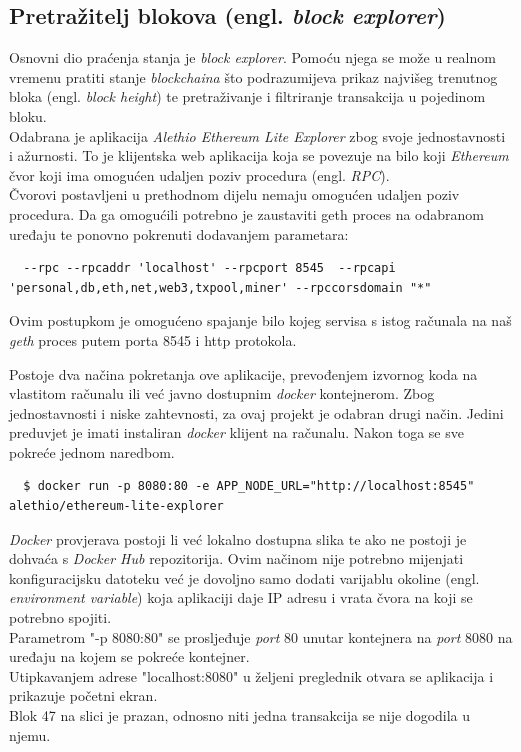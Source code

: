 \documentclass[times, utf8, zavrsni, numeric]{fer}
\begin{document}
\subsection{Pretražitelj blokova (engl. \emph{block explorer})}
Osnovni dio praćenja stanja je \emph{block explorer}. Pomoću njega se može u realnom vremenu pratiti stanje \emph{blockchaina}
što podrazumijeva prikaz najvišeg trenutnog bloka (engl. \emph{block height}) te pretraživanje i filtriranje transakcija u 
pojedinom bloku. \\
Odabrana je aplikacija \emph{Alethio Ethereum Lite Explorer} zbog svoje jednostavnosti i ažurnosti. To je klijentska
web aplikacija koja se povezuje na bilo koji \emph{Ethereum} čvor koji ima omogućen udaljen poziv procedura (engl. \emph{RPC}). \\
Čvorovi postavljeni u prethodnom dijelu nemaju omogućen udaljen poziv procedura. Da ga omogućili potrebno je zaustaviti geth proces
na odabranom uređaju te ponovno pokrenuti dodavanjem parametara:

\begin{lstlisting}
  --rpc --rpcaddr 'localhost' --rpcport 8545  --rpcapi 'personal,db,eth,net,web3,txpool,miner' --rpccorsdomain "*"
\end{lstlisting}

Ovim postupkom je omogućeno spajanje bilo kojeg servisa s istog računala na naš \emph{geth} proces putem porta 8545 i http protokola.

Postoje dva načina pokretanja ove aplikacije, prevođenjem izvornog koda na vlastitom računalu ili već javno dostupnim
\emph{docker} kontejnerom. Zbog jednostavnosti i niske zahtevnosti, za ovaj projekt je odabran drugi način.
Jedini preduvjet je imati instaliran \emph{docker} klijent na računalu. Nakon toga se sve pokreće jednom naredbom.

\begin{lstlisting}
  $ docker run -p 8080:80 -e APP_NODE_URL="http://localhost:8545" alethio/ethereum-lite-explorer
\end{lstlisting}

\emph{Docker} provjerava postoji li već lokalno dostupna slika te ako ne postoji je dohvaća s \emph{Docker Hub} repozitorija.
Ovim načinom nije potrebno mijenjati konfiguracijsku datoteku već je dovoljno samo dodati varijablu okoline (engl. \emph{environment variable})
koja aplikaciji daje IP adresu i vrata čvora na koji se potrebno spojiti. \\
Parametrom "-p 8080:80" se prosljeđuje \emph{port} 80 unutar kontejnera na \emph{port} 8080 na uređaju na kojem se pokreće kontejner. \\
Utipkavanjem adrese "localhost:8080" u željeni preglednik otvara se aplikacija i prikazuje početni ekran. \\
Blok 47 na slici je prazan, odnosno niti jedna transakcija se nije dogodila u njemu.
\end{document}
